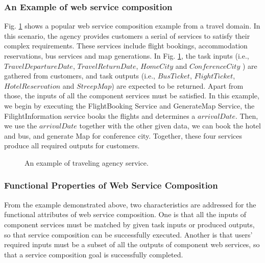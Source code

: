\subsubsection{An Example of web service composition}
Fig. \ref{fig:wsc_example} shows a popular web service composition example from a travel domain. In this scenario, the agency provides customers a serial of services to satisfy their complex requirements. These services include flight bookings, accommodation reservations, bus services and map generations. In Fig. \ref{fig:wsc_example}, the task inputs (i.e., $TravelDepartureDate$, $TravelReturnDate$, $HomeCity$ and $ConferenceCity$ ) are gathered from customers, and task outputs (i.e., $BusTicket$, $FlightTicket$, $HotelReservation$ and $StreepMap$) are expected to be returned. Apart from those, the inputs of all the component services must be satisfied. In this example, we begin by executing the FlightBooking Service and GenerateMap Service, the FilightInformation service books the flights and determines a $arrivalDate$. Then, we use the $arrivalDate$ together with the other given data, we can book the hotel and bus, and generate Map for conference city. Together, these four services produce all required outputs for customers.

\begin{figure}
\centerline{
}
\caption{An example of traveling agency service.}
\label{fig:wsc_example}
\end{figure}

\subsubsection{Functional Properties of Web Service Composition}
From the example demonstrated above, two characteristics are addressed for the functional attributes of web service composition. One is that all the inputs of component services must be matched by given task inputs or produced outputs, so that service composition can be successfully executed. Another is that users' required inputs must be a subset of all the outputs of component web services, so that a service composition goal is successfully completed. 


